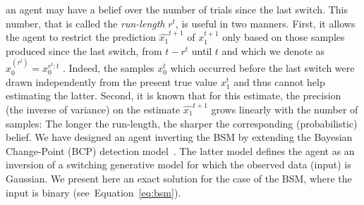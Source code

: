 \documentclass[12pt,english]{article}%
\newcommand{\citep}[1]{\parencite{#1}}
\newcommand{\seeEq}[1]{Equation~\ref{eq:#1}}
\begin{document}
an agent may have a belief over the number of trials since the last switch.
This number, that is called the \emph{run-length} $r^t$, is useful in two manners.
First, it allows the agent to restrict the prediction $\hat{x_1}^{t+1}$ of $x_1^{t+1}$
only based on those samples produced since the last switch, from $t-r^t$ until $t$ 
and which we denote as $x_0^{(r^t)}=x_0^{r^t:t}$ .
Indeed, the samples $x_0^t$ which occurred before the last switch 
were drawn independently from the present true value $x_1^t$
and thus cannot help estimating the latter.
Second, it is known that for this estimate, the precision
(the inverse of variance) on the estimate $\hat{x_1}^{t+1}$
grows linearly with the number of samples:
The longer the run-length, the sharper the corresponding (probabilistic) belief.
We have designed an agent inverting the BSM by extending
the Bayesian Change-Point (BCP) detection model~\citep{AdamsMackay2007}.
The latter model defines the agent as an inversion of a switching generative model
for which the observed data (input) is Gaussian.
We present here an exact solution for the case of the BSM, where the input is binary (see~\seeEq{bsm}).
\end{document}
